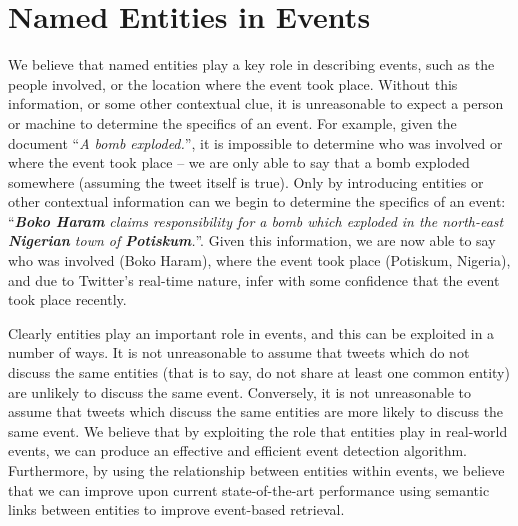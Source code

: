 


\section{Named Entities in Events}
\label{detection:sec:entityEvents}
We believe that named entities play a key role in describing events, such as the people involved, or the location where the event took place.
Without this information, or some other contextual clue, it is unreasonable to expect a person or machine to determine the specifics of an event.
For example, given the document ``\textit{A bomb exploded.}'', it is impossible to determine who was involved or where the event took place -- we are only able to say that a bomb exploded somewhere (assuming the tweet itself is true).
Only by introducing entities or other contextual information can we begin to determine the specifics of an event: ``\textit{\textbf{Boko Haram} claims responsibility for a bomb which exploded in the north-east \textbf{Nigerian} town of \textbf{Potiskum}.}''.
Given this information, we are now able to say who was involved (Boko Haram), where the event took place (Potiskum, Nigeria), and due to Twitter's real-time nature, infer with some confidence that the event took place recently.

Clearly entities play an important role in events, and this can be exploited in a number of ways.
It is not unreasonable to assume that tweets which do not discuss the same entities (that is to say, do not share at least one common entity) are unlikely to discuss the same event. Conversely, it is not unreasonable to assume that tweets which discuss the same entities are more likely to discuss the same event.
We believe that by exploiting the role that entities play in real-world events, we can produce an effective and efficient event detection algorithm.
Furthermore, by using the relationship between entities within events, we believe that we can improve upon current state-of-the-art performance using semantic links between entities to improve event-based retrieval.

